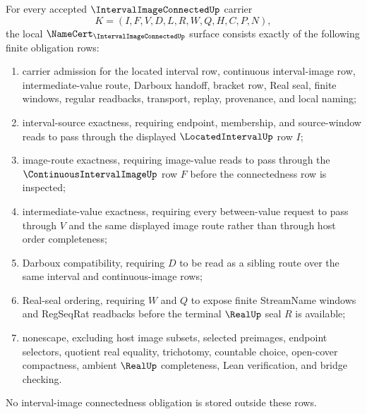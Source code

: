 \begin{theorem}
\label{thm:interval-image-connected-namecert-obligations}
For every accepted $\IntervalImageConnectedUp$ carrier
$$
K=(I,F,V,D,L,R,W,Q,H,C,P,N),
$$
the local $\NameCert_{\IntervalImageConnectedUp}$ surface consists exactly of the following finite obligation rows:
\begin{enumerate}
\item carrier admission for the located interval row, continuous interval-image row, intermediate-value route, Darboux handoff, bracket row, Real seal, finite windows, regular readbacks, transport, replay, provenance, and local naming;
\item interval-source exactness, requiring endpoint, membership, and source-window reads to pass through the displayed $\LocatedIntervalUp$ row $I$;
\item image-route exactness, requiring image-value reads to pass through the $\ContinuousIntervalImageUp$ row $F$ before the connectedness row is inspected;
\item intermediate-value exactness, requiring every between-value request to pass through $V$ and the same displayed image route rather than through host order completeness;
\item Darboux compatibility, requiring $D$ to be read as a sibling route over the same interval and continuous-image rows;
\item Real-seal ordering, requiring $W$ and $Q$ to expose finite StreamName windows and RegSeqRat readbacks before the terminal $\RealUp$ seal $R$ is available;
\item nonescape, excluding host image subsets, selected preimages, endpoint selectors, quotient real equality, trichotomy, countable choice, open-cover compactness, ambient $\RealUp$ completeness, Lean verification, and bridge checking.
\end{enumerate}
No interval-image connectedness obligation is stored outside these rows.
\end{theorem}
